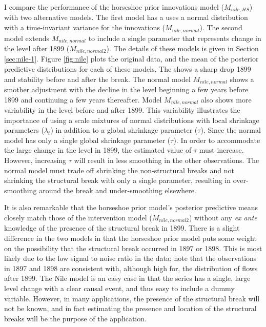 \documentclass{article}
\begin{document}
I compare the performance of the horseshoe prior innovations model ($M_{nile,HS}$) with two alternative models.
The first model has a uses a normal distribution with a time-invariant variance for the innovations ($M_{nile,normal}$).
The second model extends $M_{nile,normal}$ to include a single parameter that represents change in the level after 1899 ($M_{nile,normal2}$).
The details of these models is given in Section \ref{sec:nile-1}.
Figure \ref{fig:nile} plots the original data, and the mean of the posterior predictive distributions for each of these models.
The  shows a sharp drop 1899 and stability before and after the break.
The normal model $M_{nile,normal}$ shows a smother adjustment with the decline in the level beginning a few years before 1899 and continuing a few years thereafter.
Model $M_{nile,normal}$ also shows more variability in the level before and after 1899.
This variability illustrates the importance of using a scale mixtures of normal distributions with local shrinkage parameters ($\lambda_{t}$) in addition to a global shrinkage parameter ($\tau$).
Since the normal model has only a single global shrinkage parameter ($\tau$). 
In order to accommodate the large change in the level in 1899, the estimated value of $\tau$ must increase.
However, increasing $\tau$ will result in less smoothing in the other observations.
The normal model must trade off shrinking the non-structural breaks and not shrinking the structural break with only a single parameter, resulting in over-smoothing around the break and under-smoothing elsewhere.

It is also remarkable that the horseshoe prior model's posterior predictive means closely match those of the intervention model ($M_{nile,normal2}$) without any \textit{ex ante} knowledge of the presence of the structural break in 1899.
There is a slight difference in the two models in that the horseshoe prior model puts some weight on the possibility that the structural break occurred in 1897 or 1898.
This is most likely due to the low signal to noise ratio in the data; note that the observations in 1897 and 1898 are consistent with, although high for, the distribution of flows after 1899.
The Nile model is an easy case in that the series has a single, large level change with a clear causal event, and thus easy to include a dummy variable.
However, in many applications, the presence of the structural break will not be known, and in fact estimating the presence and location of the structural breaks will be the purpose of the application.
\end{document}
